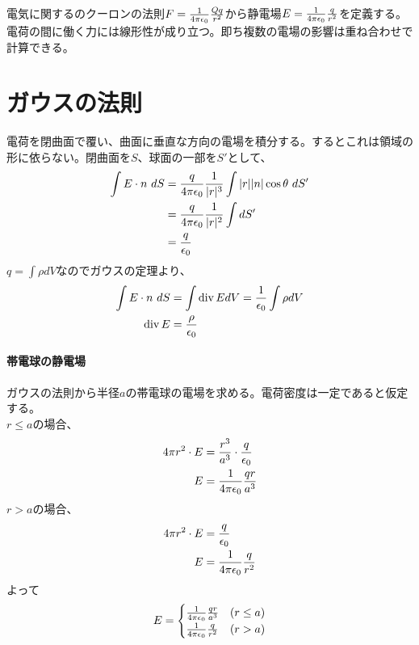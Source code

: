 
電気に関するのクーロンの法則$F=\frac{1}{4\pi\epsilon_0}\frac{Qq}{r^2}$から静電場$E=\frac{1}{4\pi\epsilon_0}\frac{q}{r^2}$を定義する。電荷の間に働く力には線形性が成り立つ。即ち複数の電場の影響は重ね合わせで計算できる。
\section{ガウスの法則}
    電荷を閉曲面で覆い、曲面に垂直な方向の電場を積分する。するとこれは領域の形に依らない。閉曲面を$S$、球面の一部を$S'$として、
    \begin{align*}
        \int E\cdot n\ dS &= \frac{q}{4\pi\epsilon_0}
        \frac{1}{|r|^3}\int |r||n|\cos\theta\ dS'\\
        &= \frac{q}{4\pi\epsilon_0}\frac{1}{|r|^2}\int dS'\\
        &= \frac{q}{\epsilon_0}
    \end{align*}
    $q = \int \rho dV$なのでガウスの定理より、
    \begin{align*}
        \int E\cdot n\ dS &= \int \mathrm{div\,} EdV = 
        \frac{1}{\epsilon_0}\int \rho dV\\
        \mathrm{div\,} E &= \frac{\rho}{\epsilon_0}
    \end{align*}
    \paragraph{帯電球の静電場}
        ガウスの法則から半径$a$の帯電球の電場を求める。電荷密度は一定であると仮定する。\\
        $r \le a$の場合、
        \begin{align*}
            4\pi r^2\cdot E &= \frac{r^3}{a^3}\cdot 
            \frac{q}{\epsilon_0}\\
            E &= \frac{1}{4\pi\epsilon_0}\frac{qr}{a^3}
        \end{align*}
        $r>a$の場合、
        \begin{align*}
            4\pi r^2\cdot E &= \frac{q}{\epsilon_0}\\
            E &= \frac{1}{4\pi\epsilon_0}\frac{q}{r^2}
        \end{align*}
        よって
            \[E = 
            \begin{cases}
                \frac{1}{4\pi\epsilon_0}\frac{qr}{a^3} & (r \le a)\\
                \frac{1}{4\pi\epsilon_0}\frac{q}{r^2} & (r>a)
            \end{cases}\]

